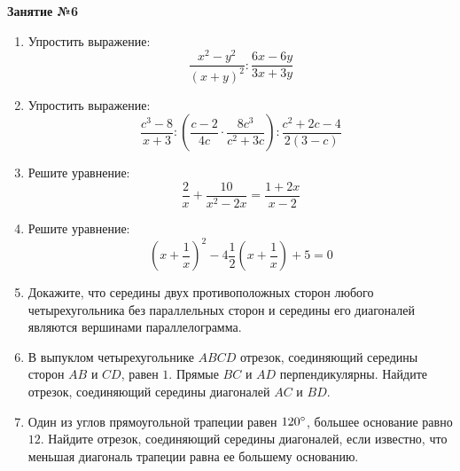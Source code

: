 \documentclass[12pt, a4paper]{article}
\begin{document}
	
	  
	\begin{center}
		\Large
		\textbf{Занятие №6}
	\end{center}
	\begin{enumerate}
		\item Упростить выражение: $$\dfrac{x^2-y^2}{(x+y)^2}:\dfrac{6x-6y}{3x+3y}$$
		\item Упростить выражение: $$\dfrac{c^3-8}{x+3}:\left( \dfrac{c-2}{4c}\cdot\dfrac{8c^3}{c^2+3c} \right):\dfrac{c^2+2c-4}{2(3-c)}$$
		\item Решите уравнение: $$\dfrac{2}{x}+\dfrac{10}{x^2-2x}=\dfrac{1+2x}{x-2}$$
		\item Решите уравнение: $$\left(x+\dfrac{1}{x}\right)^2-4\dfrac{1}{2}\left(x+\dfrac{1}{x}\right)+5=0$$
		\item Докажите, что середины двух противоположных сторон любого четырехугольника без параллельных сторон и середины его диагоналей являются вершинами параллелограмма.
		\item В выпуклом четырехугольнике $ABCD$ отрезок, соединяющий середины сторон $AB$ и $CD$, равен $1$. Прямые $BC$ и $AD$ перпендикулярны. Найдите отрезок, соединяющий середины диагоналей $AC$ и $BD$.
		\item Один из углов прямоугольной трапеции равен \( 120\degree \), большее основание равно \( 12 \). Найдите отрезок, соединяющий середины диагоналей, если известно, что меньшая диагональ трапеции равна ее большему основанию.
	\end{enumerate}
\end{document}
